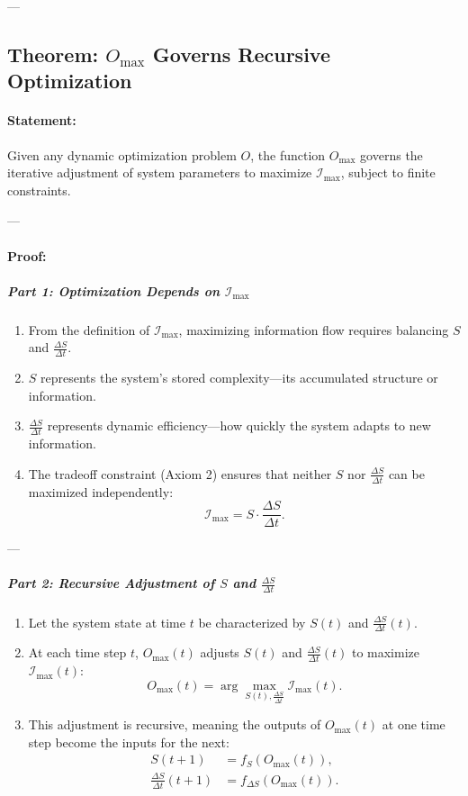 \documentclass[12pt]{article}
\begin{document}
---

\subsection{Theorem: \(O_{\text{max}}\) Governs Recursive Optimization}

\paragraph{Statement:}
Given any dynamic optimization problem \(O\), the function \(O_{\text{max}}\) governs the iterative adjustment of system parameters to maximize \(\mathcal{I}_{\text{max}}\), subject to finite constraints.

---

\paragraph{Proof:}

\subparagraph{Part 1: Optimization Depends on \(\mathcal{I}_{\text{max}}\)}
\begin{enumerate}
    \item From the definition of \(\mathcal{I}_{\text{max}}\), maximizing information flow requires balancing \(S\) and \(\frac{\Delta S}{\Delta t}\).
    \item \(S\) represents the system's stored complexity—its accumulated structure or information.
    \item \(\frac{\Delta S}{\Delta t}\) represents dynamic efficiency—how quickly the system adapts to new information.
    \item The tradeoff constraint (Axiom 2) ensures that neither \(S\) nor \(\frac{\Delta S}{\Delta t}\) can be maximized independently:
    \[
    \mathcal{I}_{\text{max}} = S \cdot \frac{\Delta S}{\Delta t}.
    \]
\end{enumerate}

---

\subparagraph{Part 2: Recursive Adjustment of \(S\) and \(\frac{\Delta S}{\Delta t}\)}
\begin{enumerate}
    \item Let the system state at time \(t\) be characterized by \(S(t)\) and \(\frac{\Delta S}{\Delta t}(t)\).
    \item At each time step \(t\), \(O_{\text{max}}(t)\) adjusts \(S(t)\) and \(\frac{\Delta S}{\Delta t}(t)\) to maximize \(\mathcal{I}_{\text{max}}(t)\):
    \[
    O_{\text{max}}(t) = \arg \max_{S(t), \frac{\Delta S}{\Delta t}} \mathcal{I}_{\text{max}}(t).
    \]
    \item This adjustment is recursive, meaning the outputs of \(O_{\text{max}}(t)\) at one time step become the inputs for the next:
    \[
    \begin{aligned}
    S(t+1) &= f_S(O_{\text{max}}(t)), \\
    \frac{\Delta S}{\Delta t}(t+1) &= f_{\Delta S}(O_{\text{max}}(t)).
    \end{aligned}
    \]
\end{enumerate}
\end{document}
